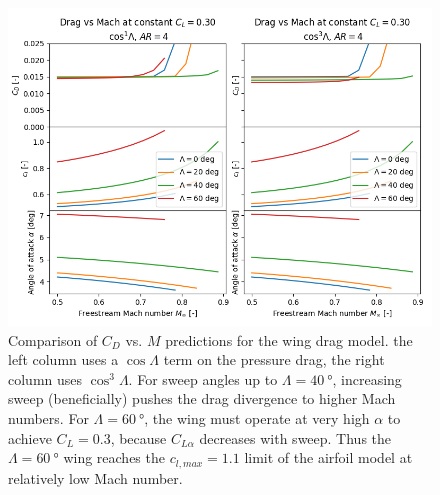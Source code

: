 \documentclass[12pt]{article}
\begin{document}
\begin{figure}[hbt!]
    \centering
    \includegraphics[width=\textwidth]{figures/wing_drag_model/drag_cos_exp}
    \caption{\label{fig:wing_model_drag_cos_exp} Comparison of $C_D$ vs. $M$ predictions for the wing drag model. the left column uses a $\cos\Lambda$ term on the pressure drag, the right column uses $\cos^3 \Lambda$. For sweep angles up to $\Lambda = \SI{40}{\degree}$, increasing sweep (beneficially) pushes the drag divergence to higher Mach numbers. For $\Lambda = \SI{60}{\degree}$, the wing must operate at very high $\alpha$ to achieve $C_L=0.3$, because $C_{L\alpha}$ decreases with sweep. Thus the $\Lambda = \SI{60}{\degree}$ wing reaches the $c_{l, max} = 1.1$ limit of the airfoil model at relatively low Mach number.}
\end{figure}
\end{document}
